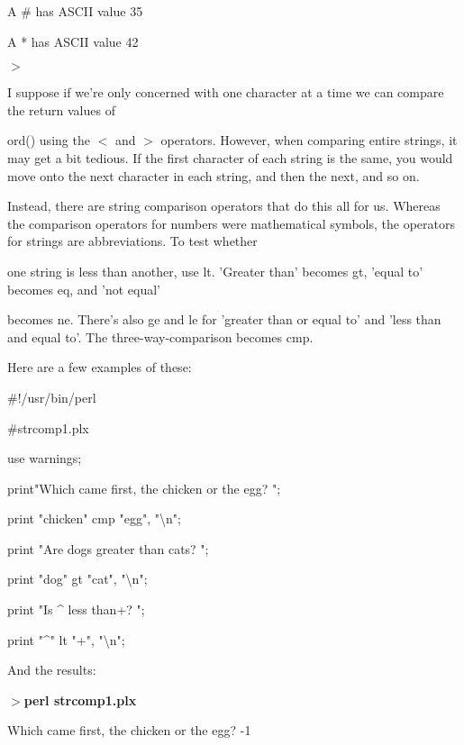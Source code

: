 \documentclass[a4paper,11pt]{book}
\begin{document}
\noindent A \# has ASCII value 35

\noindent A * has ASCII value 42

\noindent $>$

\noindent 

\noindent I suppose if we're only concerned with one character at a time we can compare the return values of

\noindent ord() using the $<$ and $>$ operators. However, when comparing entire strings, it may get a bit tedious. If the first character of each string is the same, you would move onto the next character in each string, and then the next, and so on.

\noindent 

\noindent Instead, there are string comparison operators that do this all for us. Whereas the comparison operators for numbers were mathematical symbols, the operators for strings are abbreviations. To test whether

\noindent one string is less than another, use lt. 'Greater than' becomes gt, 'equal to' becomes eq, and 'not equal'

\noindent becomes ne. There's also ge and le for 'greater than or equal to' and 'less than and equal to'. The three-way-comparison becomes cmp.

\noindent 

\noindent Here are a few examples of these:

\noindent 

\noindent 

\noindent \#!/usr/bin/perl

\noindent \#strcomp1.plx

\noindent use warnings;

\noindent print"Which came first, the chicken or the egg? ";

\noindent print "chicken" cmp "egg", "\textbackslash n";

\noindent print "Are dogs greater than cats? ";

\noindent print "dog" gt "cat", "\textbackslash n";

\noindent print "Is \^{} less than+? ";

\noindent print "\^{}" lt "+", "\textbackslash n";

\noindent 

\noindent And the results:

\noindent 

\noindent $>$\textbf{perl strcomp1.plx}

\noindent Which came first, the chicken or the egg? -1
\end{document}
